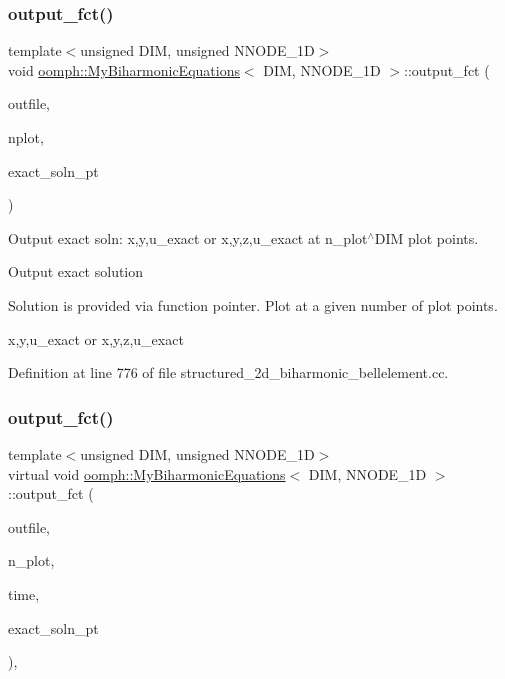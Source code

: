 \subsubsection{\texorpdfstring{output\+\_\+fct()}{output\_fct()}\hspace{0.1cm}{\footnotesize\ttfamily [1/2]}}
{\footnotesize\ttfamily template$<$unsigned D\+IM, unsigned N\+N\+O\+D\+E\+\_\+1D$>$ \\
void \hyperlink{classoomph_1_1MyBiharmonicEquations}{oomph\+::\+My\+Biharmonic\+Equations}$<$ D\+IM, N\+N\+O\+D\+E\+\_\+1D $>$\+::output\+\_\+fct (\begin{DoxyParamCaption}\item[{std\+::ostream \&}]{outfile,  }\item[{const unsigned \&}]{nplot,  }\item[{Finite\+Element\+::\+Steady\+Exact\+Solution\+Fct\+Pt}]{exact\+\_\+soln\+\_\+pt }\end{DoxyParamCaption})}



Output exact soln\+: x,y,u\+\_\+exact or x,y,z,u\+\_\+exact at n\+\_\+plot$^\wedge$\+D\+IM plot points. 

Output exact solution

Solution is provided via function pointer. Plot at a given number of plot points.

x,y,u\+\_\+exact or x,y,z,u\+\_\+exact 

Definition at line 776 of file structured\+\_\+2d\+\_\+biharmonic\+\_\+bellelement.\+cc.

\mbox{\label{classoomph_1_1MyBiharmonicEquations_a95b35b18fac5212ade1a81c26657bcdb}} 
\subsubsection{\texorpdfstring{output\+\_\+fct()}{output\_fct()}\hspace{0.1cm}{\footnotesize\ttfamily [2/2]}}
{\footnotesize\ttfamily template$<$unsigned D\+IM, unsigned N\+N\+O\+D\+E\+\_\+1D$>$ \\
virtual void \hyperlink{classoomph_1_1MyBiharmonicEquations}{oomph\+::\+My\+Biharmonic\+Equations}$<$ D\+IM, N\+N\+O\+D\+E\+\_\+1D $>$\+::output\+\_\+fct (\begin{DoxyParamCaption}\item[{std\+::ostream \&}]{outfile,  }\item[{const unsigned \&}]{n\+\_\+plot,  }\item[{const double \&}]{time,  }\item[{Finite\+Element\+::\+Unsteady\+Exact\+Solution\+Fct\+Pt}]{exact\+\_\+soln\+\_\+pt }\end{DoxyParamCaption})\hspace{0.3cm}{\ttfamily [inline]}, {\ttfamily [virtual]}}



